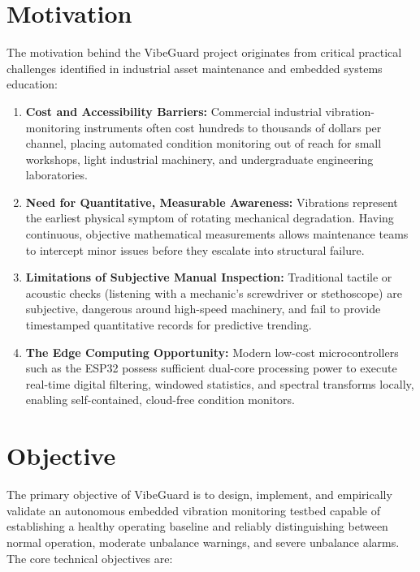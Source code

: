 \section{Motivation}
\hspace{2em}The motivation behind the VibeGuard project originates from critical practical challenges identified in industrial asset maintenance and embedded systems education:
\begin{enumerate}
    \item \textbf{Cost and Accessibility Barriers:} Commercial industrial vibration-monitoring instruments often cost hundreds to thousands of dollars per channel, placing automated condition monitoring out of reach for small workshops, light industrial machinery, and undergraduate engineering laboratories.
    \item \textbf{Need for Quantitative, Measurable Awareness:} Vibrations represent the earliest physical symptom of rotating mechanical degradation. Having continuous, objective mathematical measurements allows maintenance teams to intercept minor issues before they escalate into structural failure.
    \item \textbf{Limitations of Subjective Manual Inspection:} Traditional tactile or acoustic checks (listening with a mechanic's screwdriver or stethoscope) are subjective, dangerous around high-speed machinery, and fail to provide timestamped quantitative records for predictive trending.
    \item \textbf{The Edge Computing Opportunity:} Modern low-cost microcontrollers such as the ESP32 possess sufficient dual-core processing power to execute real-time digital filtering, windowed statistics, and spectral transforms locally, enabling self-contained, cloud-free condition monitors.
\end{enumerate}

\section{Objective}
\hspace{2em}The primary objective of VibeGuard is to design, implement, and empirically validate an autonomous embedded vibration monitoring testbed capable of establishing a healthy operating baseline and reliably distinguishing between normal operation, moderate unbalance warnings, and severe unbalance alarms. The core technical objectives are:

